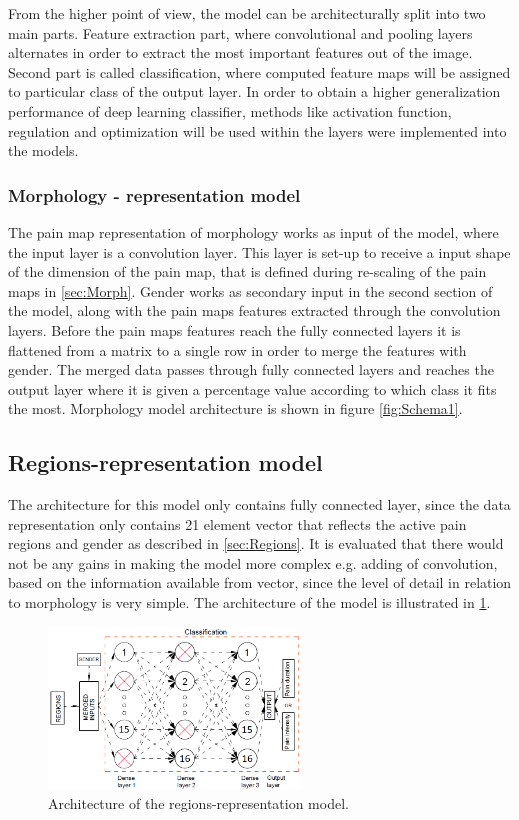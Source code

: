 From the higher point of view, the model can be architecturally split into two main parts. Feature extraction part, where convolutional and pooling layers alternates in order to extract the most important features out of the image. Second part is called classification, where computed feature maps will be assigned to particular class of the output layer. In order to obtain a higher generalization performance of deep learning classifier, methods like activation function, regulation and optimization will be used within the layers were implemented into the models.

\subsubsection{Morphology - representation model}
The pain map representation of morphology works as input of the model, where the input layer is a convolution layer. This layer is set-up to receive a input shape of the dimension of the pain map, that is defined during re-scaling of the pain maps in \ref{sec:Morph}. Gender works as secondary input in the second section of the model, along with the pain maps features extracted through the convolution layers. Before the pain maps features reach the fully connected layers it is flattened from a matrix to a single row in order to merge the features with gender. The merged data passes through fully connected layers and reaches the output layer where it is given a percentage value according to which class it fits the most. Morphology model architecture is shown in figure \ref{fig:Schema1}.

\subsection{Regions-representation model}
The architecture for this model only contains fully connected layer, since the data representation only contains 21 element vector that reflects the active pain regions and gender as described in \ref{sec:Regions}. It is evaluated that there would not be any gains in making the model more complex e.g. adding of convolution, based on the information available from vector, since the level of detail in relation to morphology is very simple. The architecture of the model is illustrated in \ref{fig:Simpleschema}.

\begin{figure} [H]
\centering
\includegraphics[width=0.6\textwidth]{figures/Simpleschema}
\caption{Architecture of the regions-representation model.}
\label{fig:Simpleschema} 
\end{figure}

